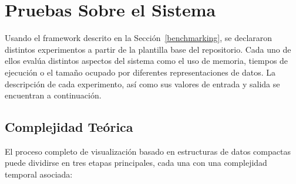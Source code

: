 



\chapter{Pruebas Sobre el Sistema}
\label{sec:pruebas-sistema}

Usando el framework descrito en la Sección~\ref{benchmarking}, se declararon distintos experimentos a partir de la plantilla base del repositorio. Cada uno de ellos evalúa distintos aspectos del sistema como el uso de memoria, tiempos de ejecución o el tamaño ocupado por diferentes representaciones de datos. La descripción de cada experimento, así como sus valores de entrada y salida se encuentran a continuación.

\section{Complejidad Teórica}

El proceso completo de visualización basado en estructuras de datos compactas puede dividirse en tres etapas principales, cada una con una complejidad temporal asociada:

